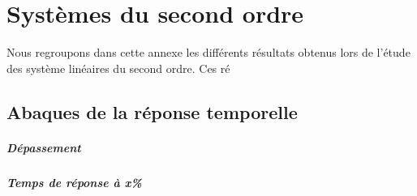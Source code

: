 \chapter{Systèmes du second ordre\label{annexe-2nd}}
Nous regroupons dans cette annexe les différents résultats obtenus lors de 
l'étude des système linéaires du second ordre. Ces ré
\newpage
\section{Abaques de la réponse temporelle}

\paragraph{Dépassement}
\begin{figure}[!hbt]
    \centering
    
\end{figure}
\paragraph{Temps de réponse à x\%}
\begin{figure}[!hbt]
\centering
    
\end{figure}
\clearpage

